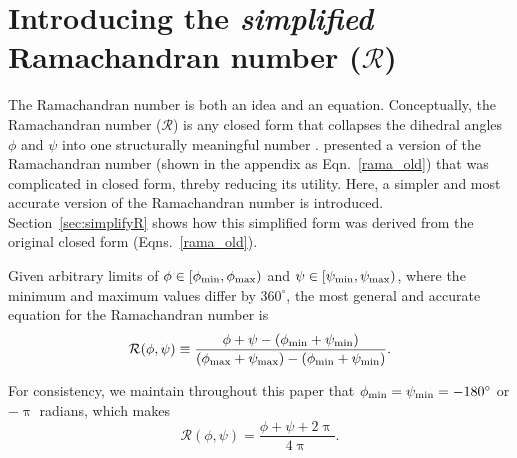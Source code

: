 \documentclass[fleqn,10pt,lineno]{wlpeerj} %
\newcommand{\Eqn}[1]{Eqn.~\ref{#1}}
\newcommand{\Eqns}[1]{Eqns.~\ref{#1}}
\begin{document}
\section*{Introducing the \textit{simplified} Ramachandran number ($\mathcal{R}$)}

The Ramachandran number is both an idea and an equation. Conceptually, 
the Ramachandran number ($\mathcal{R}$) is any closed form that 
collapses the dihedral angles $\phi$ and $\psi$ into one structurally 
meaningful number \citep{Mannige2016}. \cite{Mannige2016} presented a 
version of the Ramachandran number (shown in the appendix as \Eqn{rama_old}) that was complicated in closed form, threby reducing its utility. Here, a simpler and most accurate version of the Ramachandran number is introduced. Section~\ref{sec:simplifyR} shows how this simplified form was derived from the original closed form (\Eqns{rama_old}).


Given arbitrary limits of $\phi \in [\phi_{\rm min},\phi_{\rm max})$ and $\psi \in [\psi_{\rm min},\psi_{\rm max})$, where the minimum and maximum values differ by $360^\circ$, the most general and accurate equation for the Ramachandran number is
\begin{equation}
{\mathcal{R}}(\phi,\psi) \equiv  \frac{\phi+\psi-(\phi_{\rm min}+\psi_{\rm min})}{(\phi_{\rm max}+\psi_{\rm max})-(\phi_{\rm min}+\psi_{\rm min})}.
\label{ramaGeneral}
\end{equation}

For consistency, we maintain throughout this paper that $\phi_{\rm min} = \psi_{\rm min} = -180^\circ$ or $-\uppi$ radians, which makes 
\begin{equation}
\mathcal{R}(\phi,\psi) = \frac{\phi+\psi+2\uppi}{4\uppi}.\label{eqn:rama}
\end{equation}
\end{document}
